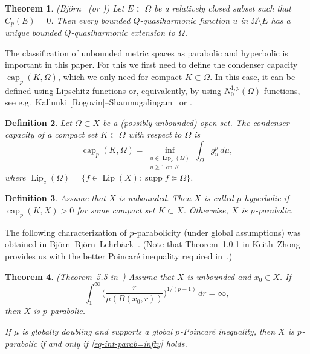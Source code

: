 \documentclass[a4paper,twoside]{article}
\theoremstyle{propositional}
\newtheorem{thm}{Theorem}[section]
\theoremstyle{descriptive}
\newtheorem{deff}[thm]{Definition}
\theoremstyle{remarkstyle}
\newcommand{\setm}{\setminus}
\newcommand{\Cp}{{C_p}}
\DeclareMathOperator{\capp}{cap}
\newcommand{\cp}{\capp_p}
\DeclareMathOperator{\Lip}{Lip}
\newcommand{\Lipc}{{\Lip_c}}
\DeclareMathOperator{\spt}{supp}
\newcommand{\supp}{\spt}
\newcommand{\Om}{\Omega}
\newcommand{\p}{{$p\mspace{1mu}$}}
\newcommand{\Np}{N^{1,p}}
\numberwithin{equation}{section}
\begin{document}
\begin{thm} \label{thm-removability-qharm}
\textup{(Bj\"orn~\cite[Theorem~6.2]{ABremove}
(or \cite[Theorem~12.2]{BBbook}))}
Let $E \subset \Om$ be a relatively closed subset such that $\Cp(E)=0$.
Then every bounded $Q$-quasiharmonic function $u$ in $\Om \setm E$
has a unique bounded  $Q$-quasiharmonic extension to $\Om$.
\end{thm}


The classification of unbounded metric spaces as parabolic and
hyperbolic is important in this paper.
For this we first need to define the condenser capacity 
$\cp(K,\Om)$, which we only need for compact $K \subset \Om$.
In this case, it can be defined using Lipschitz functions
or, equivalently, by using $\Np_0(\Om)$-functions,
see e.g.\ Kallunki [Rogovin]--Shan\-mu\-ga\-lin\-gam~\cite{KaSh} or
\cite[Definition~3.1 and Proposition~7.8]{BBglobal}.

\begin{deff} \label{deff-cp}
Let $\Om\subset X$ be a (possibly unbounded) open set.
The \emph{condenser capacity} of a compact set $K \subset \Om$
with respect to $\Om$ is
\begin{equation*} %
\cp(K,\Om) = \inf_{\substack{u \in \Lipc(\Om) \\u \ge 1 \text{ on } K}}
\int_{\Om} g_u^p\, d\mu,
\end{equation*}
where $\Lipc(\Om)=\{f \in \Lip(X) : \supp f \Subset \Om \}$.
\end{deff}




\begin{deff} \label{def-p-par}
Assume that $X$ is unbounded.
Then $X$ is called \emph{\p-hyperbolic}
if $\cp(K,X)>0$ for some compact set $K\subset X$.
Otherwise, $X$ is \emph{\p-parabolic}. 
\end{deff}


The following 
characterization of \p-parabolicity (under global assumptions) was obtained 
in Bj\"orn--Bj\"orn--Lehrb\"ack~\cite{BBLintgreen}.
(Note that Theorem~1.0.1 in Keith--Zhong~\cite{KeithZhong}
provides us with the better Poincar\'e inequality required in~\cite{BBLintgreen}.) 


\begin{thm}   \label{thm-p-parab}
\textup{(Theorem~5.5 in~\cite{BBLintgreen})}
Assume that $X$ is unbounded and  $x_0 \in X$. 
If 
\begin{equation}   \label{eq-int-parab=infty}
\int_{1}^\infty \biggl( \frac{r}{\mu(B(x_0,r))} \biggr)^{1/(p-1)} \,dr=\infty,
\end{equation}
then $X$ is \p-parabolic.

If $\mu$ is globally doubling and supports a global \p-Poincar\'e
inequality, then 
$X$ is \p-parabolic 
if and only if \eqref{eq-int-parab=infty} holds.
\end{thm}
\end{document}
